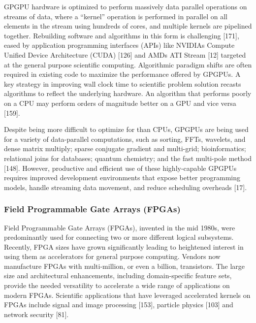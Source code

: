 GPGPU hardware is optimized to perform massively data parallel operations on streams of data,
where a “kernel” operation is performed in parallel on all elements in the stream using hundreds of
cores, and multiple kernels are pipelined together. Rebuilding software and algorithms in this form
is challenging [171], eased by application programming interfaces (APIs) like NVIDIAs Compute
Unified Device Architecture (CUDA) [126] and AMDs ATI Stream [12] targeted at the general
purpose scientific computing. Algorithmic paradigm shifts are often required in existing code to
maximize the performance offered by GPGPUs. A key strategy in improving wall clock time to
scientific problem solution recasts algorithms to reflect the underlying hardware. An algorithm that
performs poorly on a CPU may perform orders of magnitude better on a GPU and vice versa [159].

Despite being more difficult to optimize for than CPUs, GPGPUs are being used for a variety
of data-parallel computations, such as sorting, FFTs, wavelets, and dense matrix multiply; sparse
conjugate gradient and multi-grid; bioinformatics; relational joins for databases; quantum chemistry;
and the fast multi-pole method [148]. However, productive and efficient use of these highly-capable
GPGPUs requires improved development environments that expose better programming models,
handle streaming data movement, and reduce scheduling overheads [17].

\subsubsection{Field Programmable Gate Arrays (FPGAs)}
Field Programmable Gate Arrays (FPGAs), invented in the mid 1980s, were predominantly used for
connecting two or more different logical subsystems. Recently, FPGA sizes have grown significantly
leading to heightened interest in using them as accelerators for general purpose computing. Vendors
now manufacture FPGAs with multi-million, or even a billion, transistors. The large size and
architectural enhancements, including domain-specific feature sets, provide the needed versatility
to accelerate a wide range of applications on modern FPGAs. Scientific applications that have
leveraged accelerated kernels on FPGAs include signal and image processing [153], particle physics
[103] and network security [81].

